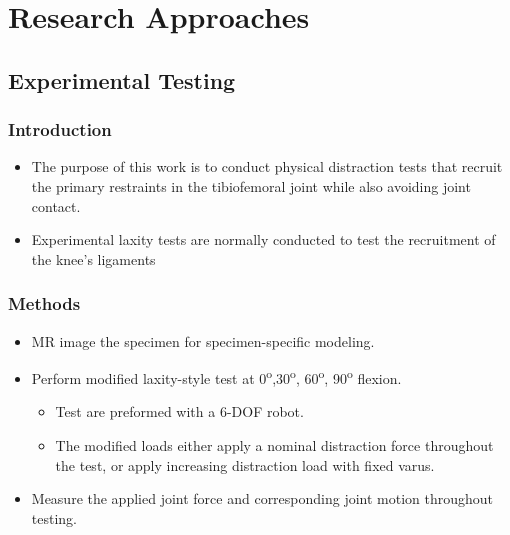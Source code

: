 \documentclass{article}
\begin{document}
\section{Research Approaches}
\subsection{Experimental Testing}
\subsubsection{Introduction}
\begin{itemize}
    \item The purpose of this work is to conduct physical distraction tests that recruit the primary restraints in the tibiofemoral joint while also avoiding joint contact.
    \item Experimental laxity tests are normally conducted to test the recruitment of the knee's ligaments \cite{imhauser_new_2017,erdemir_open_2016}
\end{itemize}

\subsubsection{Methods}
\begin{itemize}
    \item MR image the specimen for specimen-specific modeling.
    \item Perform modified laxity-style test at 0\textsuperscript{o},30\textsuperscript{o}, 60\textsuperscript{o}, 90\textsuperscript{o} flexion.
    \begin{itemize}
        \item Test are preformed with a 6-DOF robot.
        \item The modified loads either apply a nominal distraction force throughout the test, or apply increasing distraction load with fixed varus.
    \end{itemize}
    \item Measure the applied joint force and corresponding joint motion throughout testing.
\end{itemize}
\end{document}
